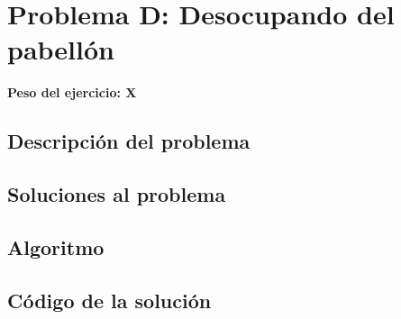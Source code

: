 \newpage{}
\section{Problema D: Desocupando del pabellón}
\textbf{Peso del ejercicio: X}
\subsection{Descripción del problema}
\subsection{Soluciones al problema}
\subsection{Algoritmo}
\newpage
\subsection{Código de la solución}
%
